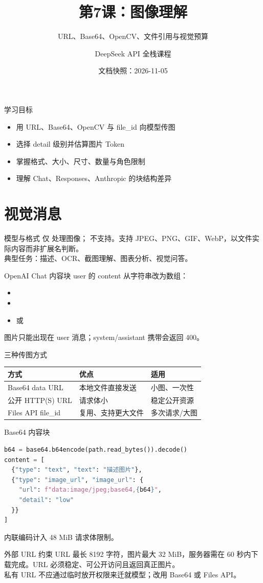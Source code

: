 \documentclass[aspectratio=169,UTF8]{ctexbeamer}
\title{第7课：图像理解}
\subtitle{URL、Base64、OpenCV、文件引用与视觉预算}
\author{DeepSeek API 全栈课程}
\date{文档快照：2026-11-05}
\begin{document}
\frame{\titlepage}
\begin{frame}{学习目标}
\begin{itemize}
  \item 用 URL、Base64、OpenCV 与 file\_id 向模型传图
  \item 选择 detail 级别并估算图片 Token
  \item 掌握格式、大小、尺寸、数量与角色限制
  \item 理解 Chat、Responses、Anthropic 的块结构差异
\end{itemize}
\end{frame}
\section{视觉消息}
\begin{frame}{模型与格式}
仅  处理图像； 不支持。支持 JPEG、PNG、GIF、WebP，以文件实际内容而非扩展名判断。\\[8pt]
典型任务：描述、OCR、截图理解、图表分析、视觉问答。
\end{frame}
\begin{frame}{OpenAI Chat 内容块}
user 的 content 从字符串改为数组：
\begin{itemize}
  \item {}
  \item {}
  \item 或 
\end{itemize}
图片只能出现在 user 消息；system/assistant 携带会返回 400。
\end{frame}
\begin{frame}{三种传图方式}
\begin{tabular}{lll}
\toprule
方式 & 优点 & 适用\\
\midrule
Base64 data URL & 本地文件直接发送 & 小图、一次性\\
公开 HTTP(S) URL & 请求体小 & 稳定公开资源\\
Files API file\_id & 复用、支持更大文件 & 多次请求/大图\\
\bottomrule
\end{tabular}
\end{frame}
\begin{frame}[fragile]{Base64 内容块}
\begin{lstlisting}[language=Python]
b64 = base64.b64encode(path.read_bytes()).decode()
content = [
  {"type": "text", "text": "描述图片"},
  {"type": "image_url", "image_url": {
    "url": f"data:image/jpeg;base64,{b64}",
    "detail": "low"
  }}
]
\end{lstlisting}
内联编码计入 48 MiB 请求体限制。
\end{frame}
\begin{frame}{外部 URL 约束}
URL 最长 8192 字符，图片最大 32 MiB，服务器需在 60 秒内下载完成。URL 必须稳定、可公开访问且返回真正图片。\\[8pt]
私有 URL 不应通过临时放开权限来迁就模型；改用 Base64 或 Files API。
\end{frame}
\end{document}
